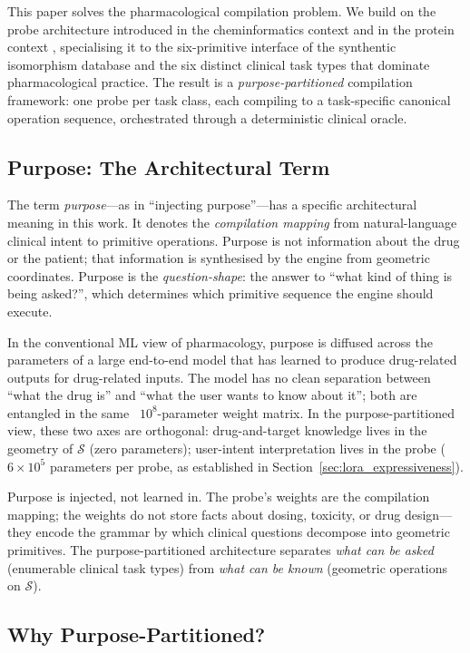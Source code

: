 \documentclass[11pt,twocolumn,a4paper]{article}
\theoremstyle{definition}
\theoremstyle{remark}
\newcommand{\Sspace}{\mathcal{S}}
\begin{document}
This paper solves the pharmacological compilation problem. We build on the probe architecture introduced in the cheminformatics context \citep{sachikonye2025d,sachikonye2025b} and in the protein context \citep{sachikonye2025c}, specialising it to the six-primitive interface of the synthentic isomorphism database and the six distinct clinical task types that dominate pharmacological practice. The result is a \emph{purpose-partitioned} compilation framework: one probe per task class, each compiling to a task-specific canonical operation sequence, orchestrated through a deterministic clinical oracle.

\subsection{Purpose: The Architectural Term}

The term \emph{purpose}---as in ``injecting purpose''---has a specific architectural meaning in this work. It denotes the \emph{compilation mapping} from natural-language clinical intent to primitive operations. Purpose is not information about the drug or the patient; that information is synthesised by the engine from geometric coordinates. Purpose is the \emph{question-shape}: the answer to ``what kind of thing is being asked?'', which determines which primitive sequence the engine should execute.

In the conventional ML view of pharmacology, purpose is diffused across the parameters of a large end-to-end model that has learned to produce drug-related outputs for drug-related inputs. The model has no clean separation between ``what the drug is'' and ``what the user wants to know about it''; both are entangled in the same ~$10^8$-parameter weight matrix. In the purpose-partitioned view, these two axes are orthogonal: drug-and-target knowledge lives in the geometry of $\Sspace$ (zero parameters); user-intent interpretation lives in the probe (~$6 \times 10^5$ parameters per probe, as established in Section~\ref{sec:lora_expressiveness}).

Purpose is injected, not learned in. The probe's weights are the compilation mapping; the weights do not store facts about dosing, toxicity, or drug design---they encode the grammar by which clinical questions decompose into geometric primitives. The purpose-partitioned architecture separates \emph{what can be asked} (enumerable clinical task types) from \emph{what can be known} (geometric operations on $\Sspace$).

\subsection{Why Purpose-Partitioned?}
\end{document}
